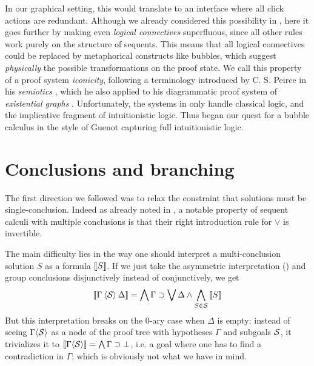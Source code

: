 In our graphical setting, this would translate to an interface where all click
actions are redundant. Although we already considered this possibility in
, here it goes further by making even \emph{logical
connectives} superfluous, since all other rules work purely on the structure of
sequents. This means that all logical connectives could be replaced by
metaphorical constructs like bubbles, which suggest \emph{physically} the
possible transformations on the proof state. We call this property of a proof
system \emph{iconicity}, following a terminology introduced by C. S. Peirce in
his \emph{semiotics} , which he also applied to his
diagrammatic proof system of \emph{existential graphs}
. Unfortunately, the systems in
\cite{guenot_nested_2013} only handle classical logic, and the implicative
fragment of intuitionistic logic. Thus began our quest for a bubble calculus in
the style of Guenot capturing full intuitionistic logic.


\section{Conclusions and branching}

The first direction we followed was to relax the constraint that solutions must
be single-conclusion. Indeed as already noted in , a
notable property of sequent calculi with multiple conclusions is that their
right introduction rule for $\lor$ is invertible.

The main difficulty lies in the way one should interpret a multi-conclusion
solution $S$ as a formula $\left\llbracket S \right\rrbracket$. If we just take the asymmetric
interpretation () and group conclusions disjunctively instead of
conjunctively, we get
$$
\left\llbracket \Gamma \mathbin{\langle \mathcal{S} \rangle} \Delta \right\rrbracket =
\bigwedge \Gamma \supset \bigvee \Delta \land \bigwedge_{S \in \mathcal{S}}{\left\llbracket S \right\rrbracket}
$$
But this interpretation breaks on the 0-ary case when $\Delta$ is empty: instead
of seeing $\Gamma \mathbin{\langle \mathcal{S} \rangle}$ as a node of the proof tree with hypotheses
$\Gamma$ and subgoals $\mathcal{S}$, it trivializes it to $\left\llbracket \Gamma
\mathbin{\langle \mathcal{S} \rangle} \right\rrbracket = \bigwedge \Gamma \supset \bot$, i.e. a goal where one has to
find a contradiction in $\Gamma$; which is obviously not what we have in mind.

